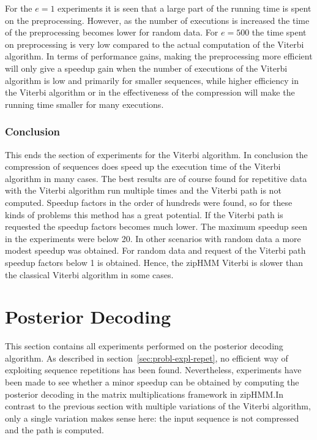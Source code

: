 For the $e = 1$ experiments it is seen that a large part of the running time is
spent on the preprocessing. However, as the number of executions is increased
the time of the preprocessing becomes lower for random data. For $e = 500$ the
time spent on preprocessing is very low compared to the actual computation of
the Viterbi algorithm. In terms of performance gains, making the preprocessing
more efficient will only give a speedup gain when the number of executions of
the Viterbi algorithm is low and primarily for smaller sequences, while higher
efficiency in the Viterbi algorithm or in the effectiveness of the compression
will make the running time smaller for many executions.

\subsubsection{Conclusion}

This ends the section of experiments for the Viterbi algorithm. In
conclusion the compression of sequences does speed up the execution time of the
Viterbi algorithm in many cases. The best results are of course found for
repetitive data with the Viterbi algorithm run multiple times and the Viterbi
path is not computed. Speedup factors in the order of hundreds were found, so
for these kinds of problems this method has a great potential. If the Viterbi
path is requested the speedup factors becomes much lower. The maximum speedup
seen in the experiments were below 20. In other scenarios with random data a
more modest speedup was obtained. For random data and request of the Viterbi
path speedup factors below 1 is obtained. Hence, the zipHMM Viterbi is slower
than the classical Viterbi algorithm in some cases.

\section{Posterior Decoding}

This section contains all experiments performed on the posterior decoding
algorithm. As described in section~\ref{sec:probl-expl-repet}, no efficient way
of exploiting sequence repetitions has been found. Nevertheless, experiments
have been made to see whether a minor speedup can be obtained by computing the
posterior decoding in the matrix multiplications framework in zipHMM.\@ In
contrast to the previous section with multiple variations of the Viterbi
algorithm, only a single variation makes sense here: the input sequence is not
compressed and the path is computed.

